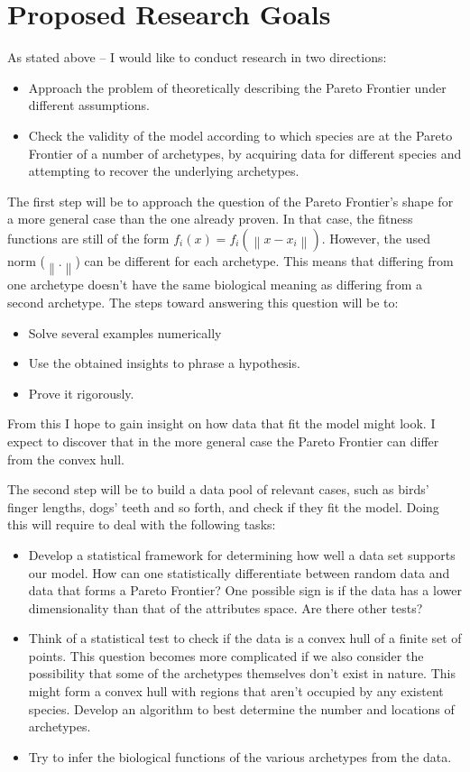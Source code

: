 \documentclass{article}
\theoremstyle{definition}
\theoremstyle{remark}
\def \norm [#1]{\left\| #1 \right\|}
\begin{document}
\section{Proposed Research Goals}
As stated above – I would like to conduct research in two directions:
\begin{itemize}
  \item Approach the problem of theoretically describing the Pareto Frontier under different assumptions.
  \item Check the validity of the model according to which species are at the Pareto Frontier 
        of a number of archetypes, 
        by acquiring data for different species and attempting to recover the underlying archetypes.
\end{itemize}
The first step will be to approach the question of the Pareto Frontier’s shape 
for a more general case than the one already proven. 
In that case, the fitness functions are still of the form 
$f_i(x) = f_i(\norm[x-x_i])$. However, the used norm ($\norm[.]$) can be different for each archetype. 
This means that differing from one archetype doesn’t have the same biological meaning as differing 
from a second archetype. The steps toward answering this question will be to:
\begin{itemize}
  \item Solve several examples numerically
  \item Use the obtained insights to phrase a hypothesis. 
  \item Prove it rigorously.
\end{itemize}

From this I hope to gain insight on how data that fit the model might look. 
I expect to discover that in the more general case the Pareto Frontier can differ from the convex hull.

The second step will be to build a data pool of relevant cases, 
such as birds’ finger lengths, dogs’ teeth and so forth, and check if they fit the model.
Doing this will require to deal with the following tasks:
\begin{itemize}
  \item Develop a statistical framework for determining how well a data set supports our model. 
	How can one statistically differentiate between random data and data that forms a Pareto Frontier? 
	One possible sign is if the data has a lower dimensionality than that of the attributes space. 
	Are there other tests?
  \item Think of a statistical test to check if the data is a convex hull of a finite set of points. 
	This question becomes more complicated if we also consider the possibility that some of the 
	archetypes themselves don't exist in nature. 
	This might form a convex hull with regions that aren't occupied by any existent species. 
	Develop an algorithm to best determine the number and locations of archetypes.
  \item Try to infer the biological functions of the various archetypes from the data.
\end{itemize}
\end{document}
